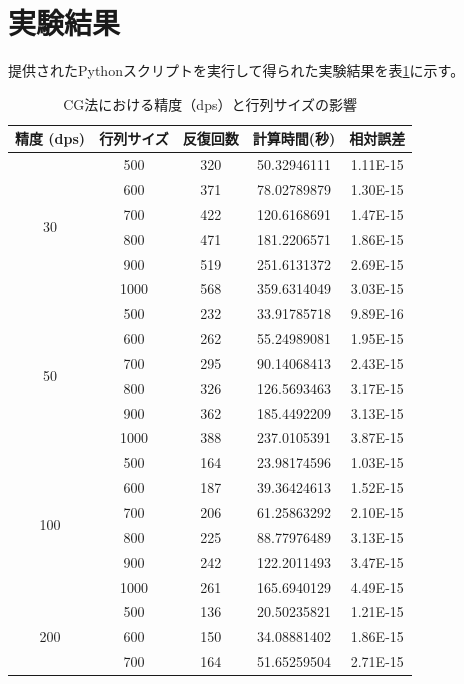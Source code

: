 \documentclass{article}
\begin{document}
\section{実験結果}
提供されたPythonスクリプトを実行して得られた実験結果を表\ref{tab:results_summary}に示す。
\begin{table}[h!]
\centering
    \caption{CG法における精度（dps）と行列サイズの影響}
    \label{tab:results_summary}
    \begin{tabular}{|c|c|c|c|c|}
        \toprule
        \textbf{精度 (dps)} & \textbf{行列サイズ} & \textbf{反復回数} & \textbf{計算時間(秒)} & \textbf{相対誤差} \\
        \midrule
        \multirow{6}{*}{30} & 500 & 320 & 50.32946111 & 1.11E-15 \\
        & 600 & 371 & 78.02789879 & 1.30E-15 \\
        & 700 & 422 & 120.6168691 & 1.47E-15 \\
        & 800 & 471 & 181.2206571 & 1.86E-15 \\
        & 900 & 519 & 251.6131372 & 2.69E-15 \\
        & 1000 & 568 & 359.6314049 & 3.03E-15 \\
        \midrule
        \multirow{6}{*}{50} & 500 & 232 & 33.91785718 & 9.89E-16 \\
        & 600 & 262 & 55.24989081 & 1.95E-15 \\
        & 700 & 295 & 90.14068413 & 2.43E-15 \\
        & 800 & 326 & 126.5693463 & 3.17E-15 \\
        & 900 & 362 & 185.4492209 & 3.13E-15 \\
        & 1000 & 388 & 237.0105391 & 3.87E-15 \\
        \midrule
        \multirow{6}{*}{100} & 500 & 164 & 23.98174596 & 1.03E-15 \\
        & 600 & 187 & 39.36424613 & 1.52E-15 \\
        & 700 & 206 & 61.25863292 & 2.10E-15 \\
        & 800 & 225 & 88.77976489 & 3.13E-15 \\
        & 900 & 242 & 122.2011493 & 3.47E-15 \\
        & 1000 & 261 & 165.6940129 & 4.49E-15 \\
        \midrule
        \multirow{6}{*}{200} & 500 & 136 & 20.50235821 & 1.21E-15 \\
        & 600 & 150 & 34.08881402 & 1.86E-15 \\
        & 700 & 164 & 51.65259504 & 2.71E-15 \\

\end{tabular}
\end{table}
\end{document}
